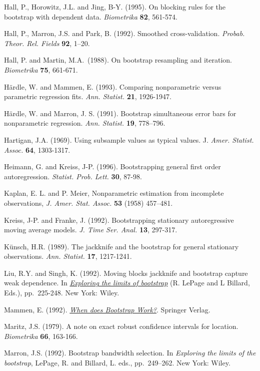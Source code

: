 \documentclass[
]{book}
\theoremstyle{break}
\theoremstyle{definition}
\theoremstyle{definition}
\theoremstyle{definition}
\theoremstyle{remark}
\begin{document}
Hall, P., Horowitz, J.L. and Jing, B-Y. (1995). On blocking rules for
the bootstrap with dependent data. \emph{Biometrika} \textbf{82}, 561-574.

Hall, P., Marron, J.S. and Park, B. (1992). Smoothed cross-validation.
\emph{Probab. Theor. Rel. Fields} \textbf{92}, 1--20.

Hall, P. and Martin, M.A.~(1988). On bootstrap resampling and iteration.
\emph{Biometrika} \textbf{75}, 661-671.

Härdle, W. and Mammen, E. (1993). Comparing nonparametric versus
parametric regression fits. \emph{Ann. Statist.} \textbf{21}, 1926-1947.

Härdle, W. and Marron, J. S. (1991). Bootstrap simultaneous error bars
for nonparametric regression. \emph{Ann. Statist.} \textbf{19}, 778--796.

Hartigan, J.A. (1969). Using subsample values as typical values. J.
\emph{Amer. Statist. Assoc.} \textbf{64}, 1303-1317.

Heimann, G. and Kreiss, J-P. (1996). Bootstrapping general first order
autoregression. \emph{Statist. Prob. Lett.} \textbf{30}, 87-98.

Kaplan, E. L. and P. Meier, Nonparametric estimation from incomplete
observations, \emph{J. Amer. Stat. Assoc.} \textbf{53} (1958) 457--481.

Kreiss, J-P. and Franke, J. (1992). Bootstrapping stationary
autoregressive moving average models. \emph{J. Time Ser. Anal.} \textbf{13},
297-317.

Künsch, H.R. (1989). The jackknife and the bootstrap for general
stationary observations. \emph{Ann. Statist.} \textbf{17}, 1217-1241.

Liu, R.Y. and Singh, K. (1992). Moving blocks jackknife and bootstrap
capture weak dependence. In \href{https://books.google.es/books?hl=es\&lr=\&id=ZJzIpNZNVLgC\&oi=fnd\&pg=PA3\&dq=Exploring+the+limits+of+the+bootstrap}{\emph{Exploring the limits of bootstrap}}
(R. LePage and L Billard, Eds.), pp.~225-248. New York: Wiley.

Mammen, E. (1992). \href{https://books.google.es/books?hl=es\&lr=\&id=zpDfBwAAQBAJ\&oi=fnd\&pg=PP8\&dq=When+does+Bootstrap+Work\%3F}{\emph{When does Bootstrap Work?}}.
Springer Verlag.

Maritz, J.S. (1979). A note on exact robust confidence intervals for
location. \emph{Biometrika} \textbf{66}, 163-166.

Marron, J.S. (1992). Bootstrap bandwidth selection. In
\emph{Exploring the limits of the bootstrap}, LePage, R. and Billard,
L. eds., pp.~249--262. New York: Wiley.
\end{document}
